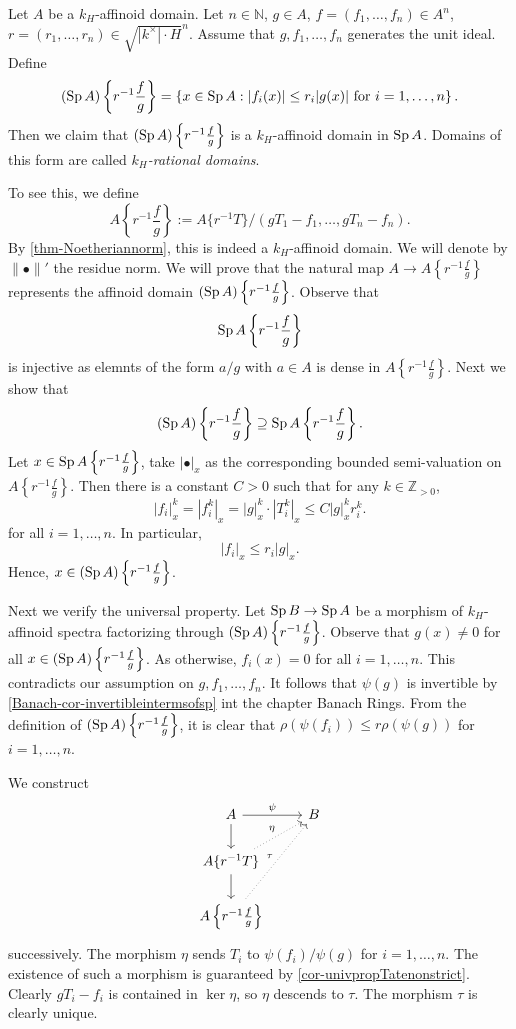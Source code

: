 \begin{example}\label{ex-rationaldomains}
    Let $A$ be a $k_H$-affinoid domain. Let $n\in \mathbb{N}$, $g\in A$, $f=(f_1,\ldots,f_n)\in A^n$, $r=(r_1,\ldots,r_n)\in \sqrt{|k^{\times}|\cdot H}^n$. Assume that $g,f_1,\ldots,f_n$ generates the unit ideal. Define
    \[
        (\operatorname{Sp} A)\left\{r^{-1}\frac{f}{g}\right\}=\left\{ x\in \operatorname{Sp} A: |f_i(x)|\leq r_i|g(x)|\text{ for }i=1,\ldots,n \right\}.  
    \]
    Then we claim that $(\operatorname{Sp} A)\left\{r^{-1}\frac{f}{g}\right\}$ is a $k_H$-affinoid domain in $\operatorname{Sp} A$. Domains of this form are called \emph{$k_H$-rational domains}.

    To see this, we define
    \[
        A\left\{r^{-1}\frac{f}{g}\right\}:=A\{r^{-1}T\}/(gT_1-f_1,\ldots,gT_n-f_n).
    \]
    By \cref{thm-Noetheriannorm}, this is indeed a $k_H$-affinoid domain. We will denote by $\|\bullet\|'$ the residue norm. We will prove that the natural map $A\rightarrow A\left\{r^{-1}\frac{f}{g}\right\}$ represents the affinoid domain $(\operatorname{Sp} A)\left\{r^{-1}\frac{f}{g}\right\}$. Observe that 
    \[
        \operatorname{Sp} A\left\{r^{-1}\frac{f}{g}\right\}
    \]
    is injective as elemnts of the form $a/g$ with $a\in A$ is dense in $A\left\{r^{-1}\frac{f}{g}\right\}$. Next we show that
    \[
        (\operatorname{Sp} A)\left\{r^{-1}\frac{f}{g}\right\}\supseteq \operatorname{Sp} A\left\{r^{-1}\frac{f}{g}\right\}.
    \]
    Let $x\in \operatorname{Sp} A\left\{r^{-1}\frac{f}{g}\right\}$, take $|\bullet|_x$ as the corresponding bounded semi-valuation on $A\left\{r^{-1}\frac{f}{g}\right\}$. Then there is a constant $C>0$ such that for any $k\in \mathbb{Z}_{>0}$,
    \[
        |f_i|_x^k=|f_i^k|_x=|g|_x^k \cdot |T_i^k|_x
        \leq C|g|_x^k r_i^k.
    \]
    for all $i=1,\ldots,n$. In particular,
    \[
        |f_i|_x\leq r_i|g|_x.  
    \]
    Hence, $x\in (\operatorname{Sp} A)\left\{r^{-1}\frac{f}{g}\right\}$.

    Next we verify the universal property. Let $\operatorname{Sp} B\rightarrow \operatorname{Sp} A$ be a morphism of $k_H$-affinoid spectra factorizing through $(\operatorname{Sp} A)\left\{r^{-1}\frac{f}{g}\right\}$. 
    Observe that $g(x)\neq 0$ for all $x\in (\operatorname{Sp} A)\left\{r^{-1}\frac{f}{g}\right\}$. As otherwise, $f_i(x)=0$ for all $i=1,\ldots,n$. This contradicts our assumption on $g,f_1,\ldots,f_n$.
    It follows that $\psi(g)$ is invertible by \cref{Banach-cor-invertibleintermsofsp} int the chapter Banach Rings. From the definition of $(\operatorname{Sp} A)\left\{r^{-1}\frac{f}{g}\right\}$, it is clear that $\rho(\psi(f_i))\leq r\rho(\psi(g))$ for $i=1,\ldots,n$.
    
    We construct 
    \[
        \begin{tikzcd}
            A \arrow[r, "\psi"] \arrow[d]                  & B \\
            {A\{r^{-1}T\}} \arrow[d] \arrow[ru, dotted,"\eta"] &   \\
            {A\left\{r^{-1}\frac{f}{g}\right\}} \arrow[ruu, dotted, "\tau"]          &  
        \end{tikzcd}
    \]
    successively. The morphism $\eta$ sends $T_i$ to $\psi(f_i)/\psi(g)$ for $i=1,\ldots,n$.  The existence of such a morphism is guaranteed by \cref{cor-univpropTatenonstrict}.  Clearly $gT_i-f_i$ is contained in $\ker \eta$, so $\eta$ descends to $\tau$. The morphism $\tau$ is clearly unique.


\end{example}
